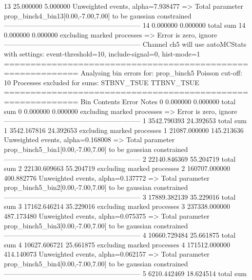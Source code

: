 13         25.000000       5.000000        Unweighted events, alpha=7.938477
  => Total parameter prop_binch4_bin13[0.00,-7.00,7.00] to be gaussian constrained
------------------------------------------------------------
14         0.000000        0.000000        total sum                     
14         0.000000        0.000000        excluding marked processes    
  => Error is zero, ignore      
------------------------------------------------------------
Channel ch5 will use autoMCStats with settings: event-threshold=10, include-signal=0, hist-mode=1
============================================================
Analysing bin errors for: prop_binch5
Poisson cut-off: 10
Processes excluded for sums: STBNV_TSUE TTBNV_TSUE
============================================================
Bin        Contents        Error           Notes                         
0          0.000000        0.000000        total sum                     
0          0.000000        0.000000        excluding marked processes    
  => Error is zero, ignore      
------------------------------------------------------------
1          3542.790393     24.392653       total sum                     
1          3542.167816     24.392653       excluding marked processes    
1          21087.000000    145.213636      Unweighted events, alpha=0.168008
  => Total parameter prop_binch5_bin1[0.00,-7.00,7.00] to be gaussian constrained
------------------------------------------------------------
2          22140.846369    55.204719       total sum                     
2          22130.609663    55.204719       excluding marked processes    
2          160707.000000   400.882776      Unweighted events, alpha=0.137772
  => Total parameter prop_binch5_bin2[0.00,-7.00,7.00] to be gaussian constrained
------------------------------------------------------------
3          17889.382139    35.229016       total sum                     
3          17162.646214    35.229016       excluding marked processes    
3          237338.000000   487.173480      Unweighted events, alpha=0.075375
  => Total parameter prop_binch5_bin3[0.00,-7.00,7.00] to be gaussian constrained
------------------------------------------------------------
4          10660.729484    25.661875       total sum                     
4          10627.606721    25.661875       excluding marked processes    
4          171512.000000   414.140073      Unweighted events, alpha=0.062157
  => Total parameter prop_binch5_bin4[0.00,-7.00,7.00] to be gaussian constrained
------------------------------------------------------------
5          6210.442469     18.624514       total sum                     
